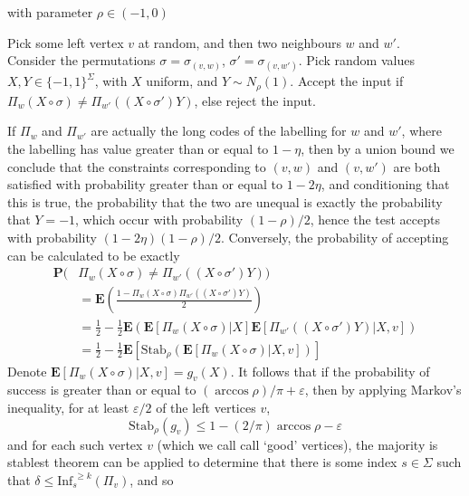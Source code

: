 \begin{algorithm}[H]
\renewcommand{\thealgorithm}{}
\caption{with parameter $\rho \in (-1,0)$}
\label{protocol1}
\begin{algorithmic}[1]
\STATE Pick some left vertex $v$ at random, and then two neighbours $w$ and $w'$.\\
\STATE Consider the permutations $\sigma = \sigma_{(v,w)}$, $\sigma' = \sigma_{(v,w')}$.
\STATE Pick random values $X,Y \in \{ -1, 1 \}^\Sigma$, with $X$ uniform, and $Y \sim N_\rho(1)$.
\STATE Accept the input if $\Pi_w(X \circ \sigma) \neq \Pi_{w'}((X \circ \sigma')Y)$, else reject the input.
\end{algorithmic}
\end{algorithm} 

If $\Pi_w$ and $\Pi_{w'}$ are actually the long codes of the labelling for $w$ and $w'$, where the labelling has value greater than or equal to $1 - \eta$, then by a union bound we conclude that the constraints corresponding to $(v,w)$ and $(v,w')$ are both satisfied with probability greater than or equal to $1 - 2\eta$, and conditioning that this is true, the probability that the two are unequal is exactly the probability that $Y = -1$, which occur with probability $(1 - \rho)/2$, hence the test accepts with probability $(1 - 2\eta)(1 - \rho)/2$. Conversely, the probability of accepting can be calculated to be exactly
%
\begin{align*}
    \mathbf{P}(&\Pi_w(X \circ \sigma) \neq \Pi_{w'}((X \circ \sigma')Y))\\
    &= \mathbf{E} \left( \frac{1 - \Pi_w(X \circ \sigma) \Pi_{w'}((X \circ \sigma')Y)}{2} \right)\\
    &= \frac{1}{2} - \frac{1}{2} \mathbf{E} \left( \mathbf{E}[\Pi_w(X \circ \sigma)|X] \mathbf{E}[\Pi_{w'}((X \circ \sigma')Y)|X,v] \right)\\
    &= \frac{1}{2} - \frac{1}{2} \mathbf{E} \left[ \text{Stab}_\rho \left( \mathbf{E}[\Pi_w(X \circ \sigma)|X,v] \right) \right]
\end{align*}
%
Denote $\mathbf{E}[\Pi_w(X \circ \sigma)|X,v] = g_v(X)$. It follows that if the probability of success is greater than or equal to $(\arccos \rho)/\pi + \varepsilon$, then by applying Markov's inequality, for at least $\varepsilon/2$ of the left vertices $v$,
%
\[ \text{Stab}_\rho \left( g_v \right) \leq 1 - (2/\pi) \arccos \rho - \varepsilon \]
%
and for each such vertex $v$ (which we call call `good' vertices), the majority is stablest theorem can be applied to determine that there is some index $s \in \Sigma$ such that $\delta \leq \text{Inf}_s^{\ \geq k}( \Pi_v )$, and so

